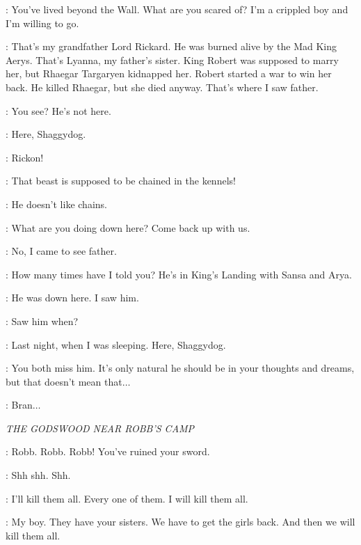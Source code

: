\BRAN: You've lived beyond the Wall. What are you scared of? I'm a crippled boy and I'm willing to go. 


\BRAN: That's my grandfather Lord Rickard. He was burned alive by the Mad King Aerys. That's Lyanna, my father's sister. King Robert was supposed to marry her, but Rhaegar Targaryen kidnapped her. Robert started a war to win her back. He killed Rhaegar, but she died anyway. That's where I saw father. 

\OSHA: You see? He's not here. 


\RICKON: Here, Shaggydog. 

\BRAN: Rickon! 

\OSHA: That beast is supposed to be chained in the kennels! 

\RICKON: He doesn't like chains. 

\BRAN: What are you doing down here? Come back up with us. 

\RICKON: No, I came to see father. 

\BRAN: How many times have I told you? He's in King's Landing with Sansa and Arya. 

\RICKON: He was down here. I saw him. 

\BRAN: Saw him when? 

\RICKON: Last night, when I was sleeping. Here, Shaggydog. 

\OSHA: You both miss him. It's only natural he should be in your thoughts and dreams, but that doesn't mean that$\ldots$  


\LUWIN: Bran$\ldots$ 


\scene

\textit{THE GODSWOOD NEAR ROBB'S CAMP} 


\CATELYN: Robb. Robb. Robb! You've ruined your sword. 


\CATELYN: Shh shh. Shh. 

\ROBB: I'll kill them all. Every one of them. I will kill them all. 

\CATELYN: My boy. They have your sisters. We have to get the girls back. And then we will kill them all. 


